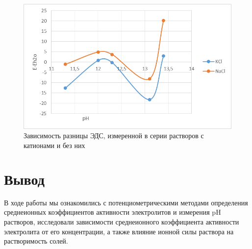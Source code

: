 \documentclass[a4paper, 12pt]{article}
\begin{document}
\begin{figure}[h!]
	\centering
	\caption{Зависимость разницы ЭДС, измеренной в серии растворов с катионами и без них}
\includegraphics[width=1\textwidth]{image017.png}
\end{figure}

\newpage
\section{Вывод}
В ходе работы мы ознакомились с потенциометрическими методами определения среднеионных коэффициентов активности электролитов и измерения pH растворов, исследовали зависимости среднеионного коэффициента активности электролита от его концентрации, а также влияние ионной силы раствора на растворимость солей.
\end{document}
